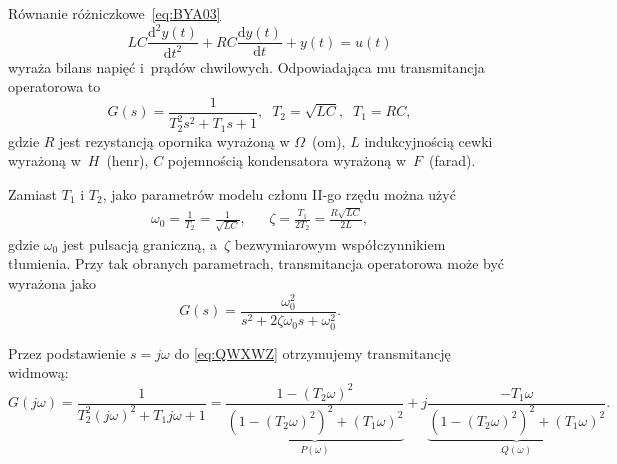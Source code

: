 \documentclass[paper=a4,DIV=12]{lpas}
\newcommand{\od}[2]{\frac{\mathrm{d}#1}{\mathrm{d}#2}}
\newcommand{\odn}[3]{\frac{\mathrm{d}^{#1}#2}{\mathrm{d}{#3}^{#1}}}
\begin{document}
\begin{appendices}
  Równanie różniczkowe~\eqref{eq:BYA03}
  \begin{equation}
    L C \odn{2}{y(t)}{t} + R C \od{y(t)}{t} + y(t) = u(t)
    \label{eq:BYA03}
  \end{equation}
  wyraża bilans napięć i~prądów chwilowych. Odpowiadająca mu transmitancja
  operatorowa to
  \begin{equation}
    G(s) = \frac{1}{T_2^2 s^2 + T_1 s + 1},
    \;\; T_2 = \sqrt{LC}, \;\; T_1 = RC,
    \label{eq:QWXWZ}
  \end{equation}
  gdzie $R$ jest rezystancją opornika wyrażoną w $\Omega$~(om), $L$
  indukcyjnością cewki wyrażoną w~$H$~(henr), $C$ pojemnością kondensatora
  wyrażoną w~$F$~(farad).

  Zamiast $T_1$ i $T_2$, jako parametrów modelu członu II-go rzędu można użyć
  \begin{equation}
    \begin{aligned}
      &
      \omega_0 = \frac{1}{T_2} = \frac{1}{\sqrt{LC}},
      &&
      \zeta = \frac{T_1}{2 T_2} = \frac{R\sqrt{LC}}{2L},
      &
    \end{aligned}
    \label{eq:TJ2HQ}
  \end{equation}
  gdzie $\omega_0$ jest pulsacją graniczną, a~$\zeta$ bezwymiarowym
  współczynnikiem tłumienia. Przy tak obranych parametrach, transmitancja
  operatorowa może być wyrażona jako
  \begin{equation}
    G(s) = \frac{\omega_0^2}{s^2 + 2\zeta\omega_0 s + \omega_0^2}.
    \label{eq:7FANL}
  \end{equation}

  Przez podstawienie $s = j\omega$ do \eqref{eq:QWXWZ}
  otrzymujemy transmitancję widmową:
  \begin{equation}
    G(j\omega) = \frac{1}{T_2^2 (j \omega)^2 + T_1 j\omega + 1}
    = \underbrace{\frac{1 - (T_2\omega)^2}{\left(1-(T_2\omega)^2\right)^2 + (T_1\omega)^2}}_{P(\omega)}
    + j \underbrace{\frac{-T_1\omega}{\left(1-(T_2\omega)^2\right)^2 + (T_1\omega)^2}}_{Q(\omega)}.
    \label{eq:LS6G7}
  \end{equation}


\end{appendices}
\end{document}

